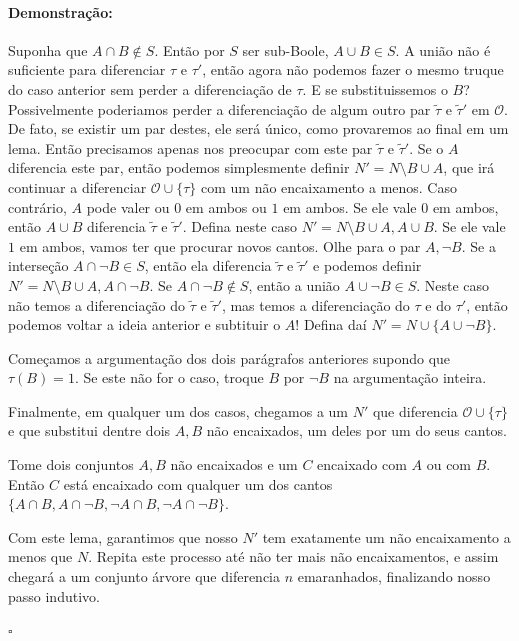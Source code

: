 \documentclass[11pt]{article}
\newcommand{\pulinho}{\vspace{.5cm}}
\theoremstyle{definition}
\theoremstyle{definition}
\theoremstyle{definition}
\theoremstyle{definition}
\theoremstyle{definition}
\theoremstyle{definition}
\theoremstyle{definition}
\theoremstyle{definition}
\theoremstyle{definition}
\theoremstyle{definition}
\theoremstyle{definition}
\theoremstyle{definition}
\newtheorem*{veronica*}{Lema}
\newenvironment{lema*}{
\definecolor{shadecolor}{HTML}{FFF1F2}
\begin{shaded}
\begin{veronica*}
}
{
\end{veronica*}
\end{shaded}
}
\newenvironment{prova}{\paragraph{Demonstração:}}{\hfill$\square$ 
\pulinho
}
\theoremstyle{definition}
\begin{document}
\begin{prova}
Suponha que $A \cap B \notin S$. Então por $S$ ser sub-Boole, $A \cup B \in S$. A união não é suficiente para diferenciar $\tau$ e $\tau'$, então agora não podemos fazer o mesmo truque do caso anterior sem perder a diferenciação de $\tau$. E se substituissemos o $B$? Possivelmente poderiamos perder a diferenciação de algum outro par $\tilde{\tau}$ e $\tilde{\tau}'$ em $\mathcal{O}$. De fato, se existir um par destes, ele será único, como provaremos ao final em um lema. Então precisamos apenas nos preocupar com este par $\tilde{\tau}$ e $\tilde{\tau}'$. Se o $A$ diferencia este par, então podemos simplesmente definir $N' = N \setminus B \cup {A}$, que irá continuar a diferenciar $\mathcal{O} \cup \{\tau\}$ com um não encaixamento a menos. Caso contrário, $A$ pode valer ou $0$ em ambos ou $1$ em ambos. Se ele vale $0$ em ambos, então $A \cup B$ diferencia $\tilde{\tau}$ e $\tilde{\tau}'$. Defina neste caso $N' = N \setminus B \cup {A, A \cup B}$. Se ele vale $1$ em ambos, vamos ter que procurar novos cantos. Olhe para o par $A, \lnot B$. Se a interseção $A \cap \lnot B \in S$, então ela diferencia $\tilde{\tau}$ e $\tilde{\tau}'$ e podemos definir $N' = N \setminus B \cup {A, A \cap \lnot B}$. Se $A \cap \lnot B \notin S$, então a união $A \cup \lnot B \in S$. Neste caso não temos a diferenciação do $\tilde{\tau}$ e $\tilde{\tau}'$, mas temos a diferenciação do $\tau$ e do $\tau'$, então podemos voltar a ideia anterior e subtituir o $A$! Defina daí $N' = N \cup \{A \cup \lnot B\}$.

Começamos a argumentação dos dois parágrafos anteriores supondo que $\tau(B) = 1$. Se este não for o caso, troque $B$ por $\lnot B$ na argumentação inteira. 

Finalmente, em qualquer um dos casos, chegamos a um $N'$ que diferencia $\mathcal{O} \cup \{\tau\}$ e que substitui dentre dois $A,B$ não encaixados, um deles por um do seus cantos.

\begin{lema*}
  Tome dois conjuntos $A,B$ não encaixados e um $C$ encaixado com $A$ ou com $B$. Então $C$ está encaixado com qualquer um dos cantos $\{A \cap B, A \cap \lnot B, \lnot A \cap B, \lnot A \cap \lnot B\}$.
\end{lema*}

Com este lema, garantimos que nosso $N'$ tem exatamente um não encaixamento a menos que $N$. Repita este processo até não ter mais não encaixamentos, e assim chegará a um conjunto árvore que diferencia $n$ emaranhados, finalizando nosso passo indutivo.


\end{prova}
\end{document}
